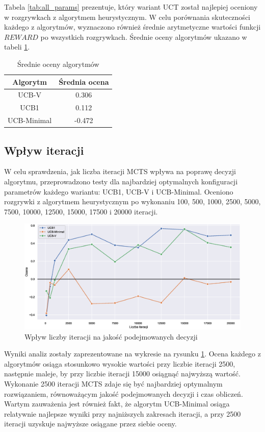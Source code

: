 \documentclass[a4paper,12pt]{article}
\begin{document}
Tabela \ref{tab:all_params} prezentuje, który wariant UCT został najlepiej oceniony w rozgrywkach z algorytmem heurystycznym. W celu porównania skuteczności każdego z algorytmów, wyznaczono również średnie arytmetyczne wartości funkcji $REWARD$ po wszystkich rozgrywkach. Średnie oceny algorytmów ukazano w tabeli \ref{tab:avg_grade}.

\begin{table}[!h]
	\centering
	\begin{tabular}{|c|c|} \hline
		Algorytm & Średnia ocena \\ \hline
		UCB-V & 0.306 \\ \hline
		UCB1 & 0.112 \\ \hline
		UCB-Minimal & -0.472 \\ \hline
	\end{tabular}
	\caption{Średnie oceny algorytmów}
	\label{tab:avg_grade}
\end{table}

\clearpage

\subsection{Wpływ iteracji} \label{subs:iterations}
W celu sprawdzenia, jak liczba iteracji MCTS wpływa na poprawę decyzji algorytmu, przeprowadzono testy dla najbardziej optymalnych konfiguracji parametrów każdego wariantu: UCB1, UCB-V i UCB-Minimal. Oceniono rozgrywki z algorytmem heurystycznym po wykonaniu 100, 500, 1000, 2500, 5000, 7500, 10000, 12500, 15000, 17500 i 20000 iteracji.

\begin{figure}[h]
	\centering
	\includegraphics[width=\textwidth]{iterations}
	\caption{Wpływ liczby iteracji na jakość podejmowanych decyzji}
	\label{rys:iterations}
\end{figure}

Wyniki analiz zostały zaprezentowane na wykresie na rysunku \ref{rys:iterations}. Ocena każdego z algorytmów osiąga stosunkowo wysokie wartości przy liczbie iteracji 2500, następnie maleje, by przy liczbie iteracji 15000 osiągnąć najwyższą wartość. Wykonanie 2500 iteracji MCTS zdaje się być najbardziej optymalnym rozwiązaniem, równoważącym jakość podejmowanych decyzji i czas obliczeń. Wartym zauważenia jest również fakt, że algorytm UCB-Minimal osiąga relatywnie najlepsze wyniki przy najniższych zakresach iteracji, a przy 2500 iteracji uzyskuje najwyższe osiągane przez siebie oceny.
\end{document}
